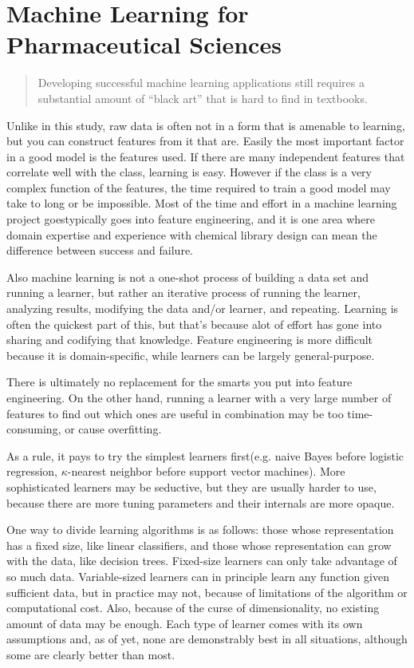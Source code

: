 \section{Machine Learning for Pharmaceutical Sciences}
\begin{quote}
Developing successful machine learning applications still requires a substantial amount of “black art” that is hard to find in textbooks.\cite{Domingos2012}
\end{quote}

Unlike in this study, raw data is often not in a form that is amenable to learning, but you can construct features from it that are. Easily the most important factor in a good model is the features used. If there are many independent features that correlate well with the class, learning is easy. However if the class is a very complex function of the features, the time required to train a good model may take to long or be impossible. \cite{Domingos2012} Most of the time and effort in a machine learning project goestypically goes into feature engineering, and it is one area where domain expertise and experience with chemical library design can mean the difference between success and failure.

Also machine learning is not a one-shot process of building a data set and running a learner, but rather an iterative process of running the learner, analyzing results, modifying the data and/or learner, and repeating. Learning is often the quickest part of this, but that’s because alot of effort has gone into sharing and codifying that knowledge. Feature engineering is more difficult because it is domain-specific, while learners can be largely general-purpose.\cite{Domingos2012}

There is ultimately no replacement for the smarts you put into feature engineering. On the other hand, running a learner with a very large number of features to find out which ones are useful in combination may be too time-consuming, or cause overfitting.\cite{Domingos2012}

As a rule, it pays to try the simplest learners first(e.g. naive Bayes before logistic regression, $\kappa$-nearest neighbor before support vector machines). More sophisticated learners may be seductive, but they are usually harder to use, because there are more tuning parameters and their internals are more opaque.\cite{Domingos2012}

One way to divide learning algorithms is as follows: those whose representation has a fixed size, like linear classifiers, and those whose representation can grow with the data, like decision trees. Fixed-size learners can only take advantage of so much data. Variable-sized learners can in principle learn any function given sufficient data, but in practice may not, because of limitations of the algorithm or computational cost. Also, because of the curse of dimensionality, no existing amount of data may be enough. \cite{Domingos2012} Each type of learner comes with its own assumptions and, as of yet, none are demonstrably best in all situations, although some are clearly better than most. \cite{Hand2006,Delgado2014}


